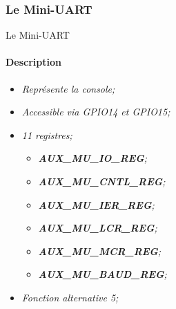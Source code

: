 \documentclass[french]{beamer}
\begin{document}
\subsubsection{Le Mini-UART}
\begin{frame}
	\transsplitverticalout
\end{frame}
\begin{frame}{Le Mini-UART}
	\framesubtitle{Description}
	\begin{beamerboxesrounded}[scheme=blocgrisclair]{}
		\begin{center}
			\begin{itemize}
				\color{nb}
				\large
				\item<1-> \textit{Représente la console;}
				\item<2-> \textit{Accessible via GPIO14 et GPIO15;}
				\item<3-> \textit{11 registres;}
				\begin{itemize}
					\color{white}
					\item<4-> \textit{\textbf{AUX\_MU\_IO\_REG};}
					\item<5-> \textit{\textbf{AUX\_MU\_CNTL\_REG};}
					\item<6-> \textit{\textbf{AUX\_MU\_IER\_REG};}
					\item<7-> \textit{\textbf{AUX\_MU\_LCR\_REG};}
					\item<8-> \textit{\textbf{AUX\_MU\_MCR\_REG};}
					\item<9-> \textit{\textbf{AUX\_MU\_BAUD\_REG};}	
				\end{itemize}
				\item<10-> \textit{Fonction alternative 5;}
			\end{itemize}
		\end{center}
	\end{beamerboxesrounded}
\end{frame}
\end{document}
